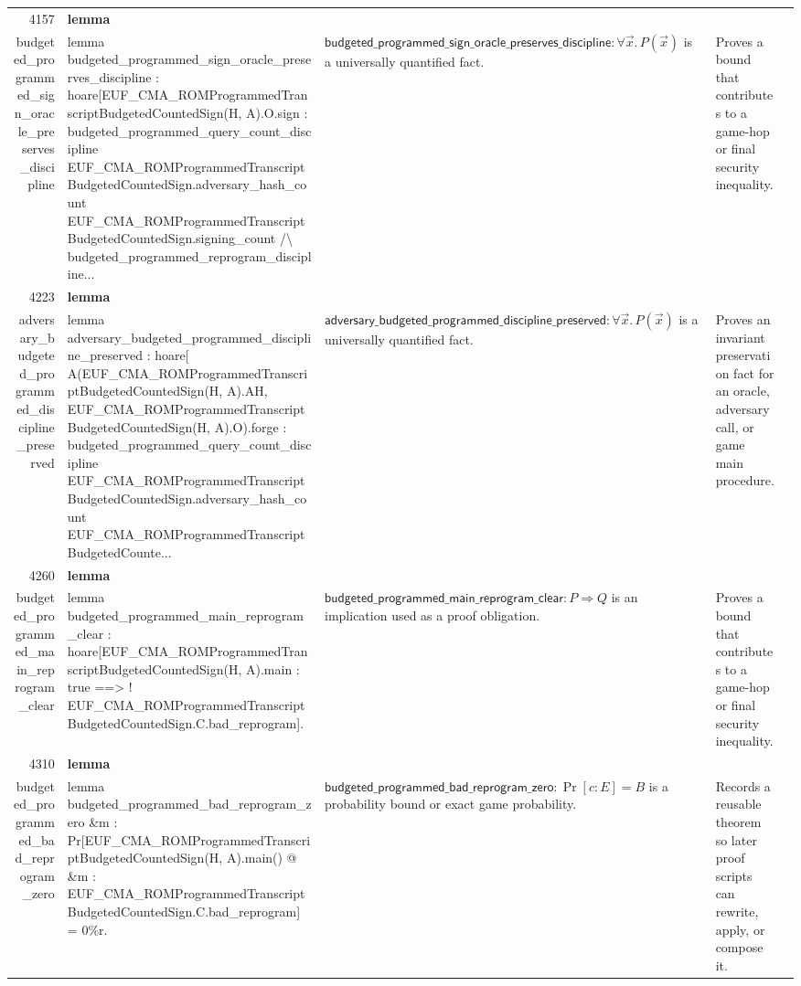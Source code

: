 \documentclass[10pt]{article}
\newcommand{\ec}[1]{\begingroup\ttfamily\scriptsize #1\endgroup}
\begin{document}
\begin{longtable}{r L{0.17\textwidth} L{0.26\textwidth} L{0.27\textwidth} L{0.20\textwidth}}
4157 & \textbf{lemma}\\\ec{budgeted\_programmed\_sign\_oracle\_preserves\_discipline} & \ec{lemma budgeted\_programmed\_sign\_oracle\_preserves\_discipline : hoare[EUF\_CMA\_ROMProgrammedTranscriptBudgetedCountedSign(H, A).O.sign : budgeted\_programmed\_query\_count\_discipline EUF\_CMA\_ROMProgrammedTranscriptBudgetedCountedSign.adversary\_hash\_count EUF\_CMA\_ROMProgrammedTranscriptBudgetedCountedSign.signing\_count /\textbackslash{} budgeted\_programmed\_reprogram\_discipline...} & \(\mathsf{budgeted\_programmed\_sign\_oracle\_preserves\_discipline} : \forall \vec{x}.\, P(\vec{x})\) is a universally quantified fact. & Proves a bound that contributes to a game-hop or final security inequality. \\
4223 & \textbf{lemma}\\\ec{adversary\_budgeted\_programmed\_discipline\_preserved} & \ec{lemma adversary\_budgeted\_programmed\_discipline\_preserved : hoare[ A(EUF\_CMA\_ROMProgrammedTranscriptBudgetedCountedSign(H, A).AH, EUF\_CMA\_ROMProgrammedTranscriptBudgetedCountedSign(H, A).O).forge : budgeted\_programmed\_query\_count\_discipline EUF\_CMA\_ROMProgrammedTranscriptBudgetedCountedSign.adversary\_hash\_count EUF\_CMA\_ROMProgrammedTranscriptBudgetedCounte...} & \(\mathsf{adversary\_budgeted\_programmed\_discipline\_preserved} : \forall \vec{x}.\, P(\vec{x})\) is a universally quantified fact. & Proves an invariant preservation fact for an oracle, adversary call, or game main procedure. \\
4260 & \textbf{lemma}\\\ec{budgeted\_programmed\_main\_reprogram\_clear} & \ec{lemma budgeted\_programmed\_main\_reprogram\_clear : hoare[EUF\_CMA\_ROMProgrammedTranscriptBudgetedCountedSign(H, A).main : true ==> ! EUF\_CMA\_ROMProgrammedTranscriptBudgetedCountedSign.C.bad\_reprogram].} & \(\mathsf{budgeted\_programmed\_main\_reprogram\_clear} : P \Rightarrow Q\) is an implication used as a proof obligation. & Proves a bound that contributes to a game-hop or final security inequality. \\
4310 & \textbf{lemma}\\\ec{budgeted\_programmed\_bad\_reprogram\_zero} & \ec{lemma budgeted\_programmed\_bad\_reprogram\_zero \&m : Pr[EUF\_CMA\_ROMProgrammedTranscriptBudgetedCountedSign(H, A).main() @ \&m : EUF\_CMA\_ROMProgrammedTranscriptBudgetedCountedSign.C.bad\_reprogram] = 0\%r.} & \(\mathsf{budgeted\_programmed\_bad\_reprogram\_zero} : \Pr[c : E] = B\) is a probability bound or exact game probability. & Records a reusable theorem so later proof scripts can rewrite, apply, or compose it. \\

\end{longtable}
\end{document}
